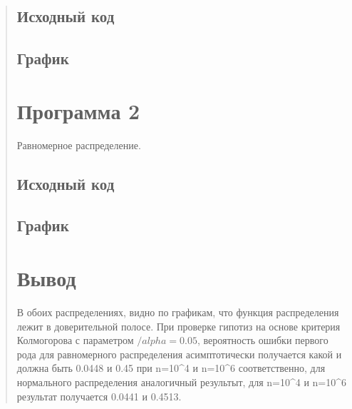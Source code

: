 \documentclass{article}
\begin{document}
\begin{quote}
\subsection{Исходный код}
        \begin{minipage}{\linewidth}
            
        \end{minipage}
\subsection{График}

\section{Программа 2}
	Равномерное распределение.
\subsection{Исходный код}
        \begin{minipage}{\linewidth}
	    
        \end{minipage}
\subsection{График}

\section{Вывод}
	В обоих распределениях, видно по графикам, что функция распределения лежит в 
	доверительной полосе. 
	При проверке гипотиз на основе критерия Колмогорова с параметром $/alpha = 0.05$, вероятность ошибки первого рода для равномерного распределения асимптотически получается какой и должна быть 0.0448 и 0.45 при n=10^4 и n=10^6 соответственно, для нормального распределения аналогичный результыт, для n=10^4 и n=10^6 результат получается 0.0441 и 0.4513.
\end{quote}
\end{document}

